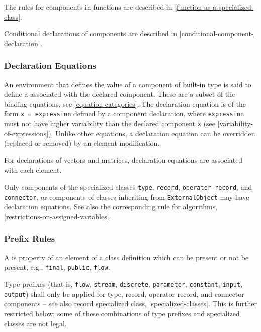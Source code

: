 The rules for components in functions are described in \cref{function-as-a-specialized-class}.

Conditional declarations of components are described in \cref{conditional-component-declaration}.

\subsubsection{Declaration Equations}\label{declaration-equations}

An environment that defines the value of a component of built-in type is said to define a  associated with the declared component.
These are a subset of the binding equations, see \cref{equation-categories}.
The declaration equation is of the form \lstinline!x = expression! defined by a component declaration, where \lstinline!expression! must not have higher variability than the declared component \lstinline!x! (see \cref{variability-of-expressions}).
Unlike other equations, a declaration equation can be overridden (replaced or removed) by an element modification.

For declarations of vectors and matrices, declaration equations are associated with each element.

Only components of the specialized classes \lstinline!type!, \lstinline!record!, \lstinline!operator record!, and \lstinline!connector!, or components of classes inheriting from \lstinline!ExternalObject! may have declaration equations.
See also the corresponding rule for algorithms, \cref{restrictions-on-assigned-variables}.

\subsubsection{Prefix Rules}\label{prefix-rules}

A  is property of an element of a class definition which can be present or not be present, e.g., \lstinline!final!, \lstinline!public!, \lstinline!flow!.

Type prefixes (that is, \lstinline!flow!, \lstinline!stream!, \lstinline!discrete!, \lstinline!parameter!, \lstinline!constant!, \lstinline!input!, \lstinline!output!) shall only be applied for type, record, operator record, and connector components -- see also record specialized class, \cref{specialized-classes}.
This is further restricted below; some of these combinations of type prefixes and specialized classes are not legal.

